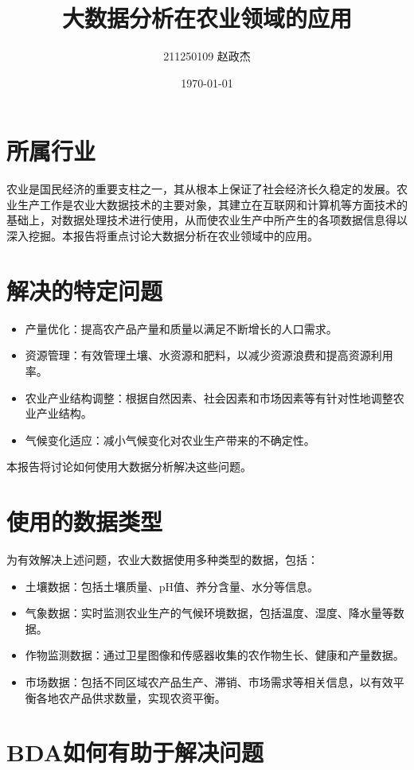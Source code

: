 \documentclass{article}
\begin{document}
\title{大数据分析在农业领域的应用}
\author{211250109 赵政杰}
\date{\today}
\maketitle

\section{所属行业}
农业是国民经济的重要支柱之一，其从根本上保证了社会经济长久稳定的发展。农业生产工作是农业大数据技术的主要对象，其建立在互联网和计算机等方面技术的基础上，对数据处理技术进行使用，从而使农业生产中所产生的各项数据信息得以深入挖掘。本报告将重点讨论大数据分析在农业领域中的应用。

\section{解决的特定问题}

\begin{itemize}
    \item 产量优化：提高农产品产量和质量以满足不断增长的人口需求。
    \item 资源管理：有效管理土壤、水资源和肥料，以减少资源浪费和提高资源利用率。
    \item 农业产业结构调整：根据自然因素、社会因素和市场因素等有针对性地调整农业产业结构。
    \item 气候变化适应：减小气候变化对农业生产带来的不确定性。
\end{itemize}
本报告将讨论如何使用大数据分析解决这些问题。

\section{使用的数据类型}
为有效解决上述问题，农业大数据使用多种类型的数据，包括：
\begin{itemize}
    \item 土壤数据：包括土壤质量、pH值、养分含量、水分等信息。
    \item 气象数据：实时监测农业生产的气候环境数据，包括温度、湿度、降水量等数据。
    \item 作物监测数据：通过卫星图像和传感器收集的农作物生长、健康和产量数据。
    \item 市场数据：包括不同区域农产品生产、滞销、市场需求等相关信息，以有效平衡各地农产品供求数量，实现农资平衡。
\end{itemize}

\section{BDA如何有助于解决问题}
\end{document}
